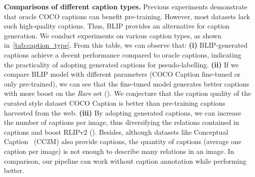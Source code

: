 \textbf{Comparisons of different caption types.}
Previous experiments demonstrate that oracle COCO captions can benefit pre-training.
However, most datasets lack such high-quality captions.
Thus, BLIP provides an alternative for caption generation.
We conduct experiments on various caption types, as shown in~\cref{tab:caption_type}.
From this table, we can observe that:
\textbf{(i)} BLIP-generated captions achieve a decent performance compared to oracle captions, indicating the practicality of adopting generated captions for pseudo-labelling.
\textbf{(ii)} If we compare BLIP model with different parameters (COCO Caption fine-tuned or only pre-trained), we can see that the fine-tuned model generates better captions with more boost on the \textit{Rare} set (). 
We conjecture that the caption quality of the curated style dataset COCO Caption is better than pre-training captions harvested from the web. 
\textbf{(iii)} By adopting generated captions, we can increase the number of captions per image, thus diversifying the relations contained in captions and boost RLIPv2 ().
Besides, although datasets like Conceptual Caption~\cite{sharma2018CC3M} (CC3M) also provide captions, the quantity of captions (average one caption per image) is not enough to describe many relations in an image.
In comparison, our pipeline can work without caption annotation while performing better.



